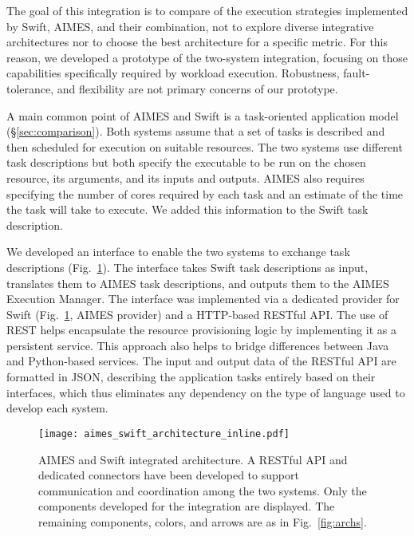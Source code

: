 \documentclass[10pt, conference, compsocconf]{IEEEtran}
\begin{document}
The goal of this integration is to compare of the execution strategies
implemented by Swift, AIMES, and their combination, not to explore diverse
integrative architectures nor to choose the best architecture for a specific
metric. For this reason, we developed a prototype of the two-system
integration, focusing on those capabilities specifically required by workload
execution. Robustness, fault-tolerance, and flexibility are not primary
concerns of our prototype.

A main common point of AIMES and Swift is a task-oriented application model
(\S\ref{sec:comparison}). Both systems assume that a set of tasks is
described and then scheduled for execution on suitable resources. The two
systems use different task descriptions but both specify the executable to be
run on the chosen resource, its arguments, and its inputs and outputs. AIMES
also requires specifying the number of cores required by each task and an
estimate of the time the task will take to execute. We added this information
to the Swift task description.

We developed an interface to enable the two systems to exchange task
descriptions (Fig.~\ref{fig:aimes-swift-arch}). The interface takes Swift
task descriptions as input, translates them to AIMES task descriptions, and
outputs them to the AIMES Execution Manager. The interface was implemented
via a dedicated provider for Swift (Fig.~\ref{fig:aimes-swift-arch}, AIMES
provider) and a HTTP-based RESTful API\@. The use of REST helps encapsulate
the resource provisioning logic by implementing it as a persistent service.
This approach also helps to bridge differences between Java and Python-based
services. The input and output data of the RESTful API are formatted in JSON,
describing the application tasks entirely based on their interfaces, which
thus eliminates any dependency on the type of language used to develop each
system.

\begin{figure}[t]
    \centering
    \texttt{[image: aimes\_swift\_architecture\_inline.pdf]}
    \caption{AIMES and Swift integrated architecture. A RESTful API and
             dedicated connectors have been developed to support
             communication and coordination among the two systems. Only the
             components developed for the integration are displayed. The
             remaining components, colors, and arrows are as in
             Fig.~\ref{fig:archs}.\label{fig:aimes-swift-arch}}
\end{figure}
\end{document}
